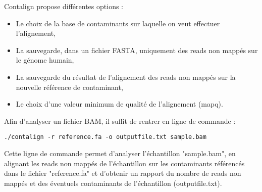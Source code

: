 \documentclass[a4paper,12pt]{article}
\begin{document}
Contalign propose différentes options  :
\begin{itemize}
\item Le choix de la base de contaminants sur laquelle on veut effectuer l'alignement,
\item La sauvegarde, dans un fichier FASTA, uniquement des reads non mappés sur le génome humain,
\item La sauvegarde du résultat de l'alignement des reads non mappés sur la nouvelle référence de contaminant,
\item Le choix d'une valeur minimum de qualité de l'alignement (mapq).
\end{itemize}
\clearpage
Afin d'analyser un fichier BAM, il suffit de rentrer en ligne de commande :
\begin{lstlisting}
./contalign -r reference.fa -o outputfile.txt sample.bam 
\end{lstlisting}

Cette ligne de commande permet d'analyser l'échantillon "sample.bam", en alignant les reads non mappés de l'échantillon sur les contaminants référencés dans le fichier "reference.fa" et d'obtenir un rapport du nombre de reads non mappés et des éventuels contaminants de l'échantillon (outputfile.txt). \\
\end{document}
